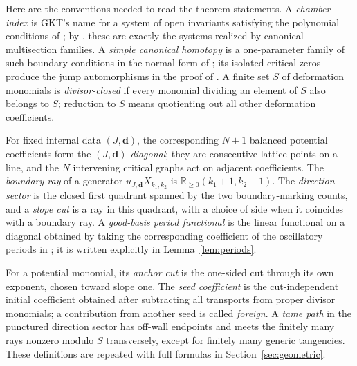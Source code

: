 \documentclass[11pt]{amsart}
\theoremstyle{definition}
\theoremstyle{remark}
\begin{document}
Here are the conventions needed to read the theorem statements.  A
\emph{chamber index} is GKT's name for a system of open invariants satisfying
the polynomial conditions of \cite[Def.~3.47]{GKT}; by
\cite[Cor.~5.14]{GKT}, these are exactly the systems realized by canonical
multisection families.  A \emph{simple canonical homotopy} is a
one-parameter family of such boundary conditions in the normal form of
\cite[Lem.~3.40]{GKT}; its isolated critical zeros produce the jump
automorphisms in the proof of \cite[Thm.~5.9]{GKT}.  A finite set $S$ of
deformation monomials is \emph{divisor-closed} if every monomial dividing an
element of $S$ also belongs to $S$; reduction to $S$ means quotienting out all
other deformation coefficients.

For fixed internal data $(J,\mathbf d)$, the corresponding $N+1$ balanced
potential coefficients form the \emph{$(J,\mathbf d)$-diagonal}; they are
consecutive lattice points on a line, and the $N$ intervening critical graphs
act on adjacent coefficients.  The \emph{boundary ray} of a generator
$u_{J,\mathbf d}X_{k_1,k_2}$ is
$\mathbb R_{\ge0}(k_1+1,k_2+1)$.  The \emph{direction sector} is the closed
first quadrant spanned by the two boundary-marking counts, and a
\emph{slope cut} is a ray in this quadrant, with a choice of side when it
coincides with a boundary ray.  A \emph{good-basis period functional} is the
linear functional on a diagonal obtained by taking the corresponding
coefficient of the oscillatory periods in \cite[Thm.~0.3]{GKT}; it is written
explicitly in Lemma~\ref{lem:periods}.

For a potential monomial, its \emph{anchor cut} is the one-sided cut through
its own exponent, chosen toward slope one.  The \emph{seed coefficient} is the
cut-independent initial coefficient obtained after subtracting all transports
from proper divisor monomials; a contribution from another seed is called
\emph{foreign}.  A \emph{tame path} in the punctured direction sector has
off-wall endpoints and meets the finitely many rays nonzero modulo $S$
transversely, except for finitely many generic tangencies.  These definitions
are repeated with full formulas in Section~\ref{sec:geometric}.
\end{document}

